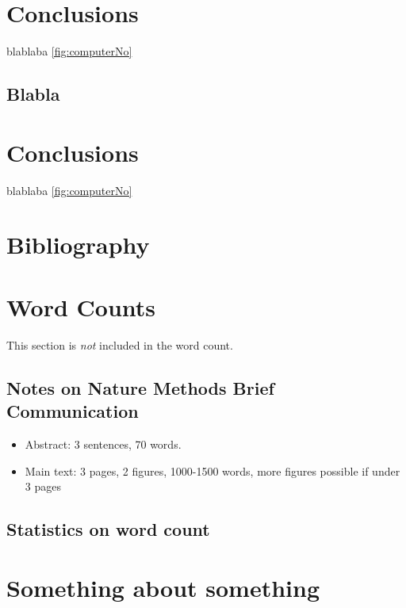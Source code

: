 \documentclass[times, twoside, watermark]{StyleBioRxiv}
\begin{document}
\section*{Conclusions}

blablaba \ref{fig:computerNo} 
\blindtext

\subsection*{Blabla} 
\blindtext

\section*{Conclusions}

blablaba \ref{fig:computerNo}
\blindtext

\begin{acknowledgements}
\blindtext
\end{acknowledgements}

\section*{Bibliography}


\onecolumn
\newpage

\section*{Word Counts}
This section is \textit{not} included in the word count. 
\subsection*{Notes on Nature Methods Brief Communication}
\begin{itemize}
\item Abstract: 3 sentences, 70 words.
\item Main text: 3 pages, 2 figures, 1000-1500 words, more figures possible if under 3 pages
\end{itemize}

\subsection*{Statistics on word count}
\detailtexcount
\newpage

\captionsetup*{format=largeformat}
\section{Something about something} \label{note:Note1} 
\Blindtext

\end{document}
